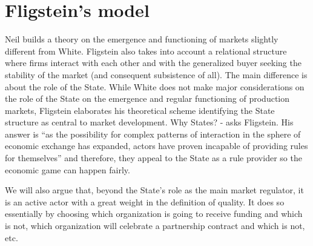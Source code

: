 \documentclass[a4paper, 12pt, openright, oneside, german, french, brazil, english]{abntex2}
\begin{document}
	
	\section{Fligstein's model}
	
	
	
	Neil  builds a theory on the emergence and functioning of markets slightly different from White. Fligstein also takes into account a relational structure where firms interact with each other and with the generalized buyer seeking the stability of the market (and consequent subsistence of all). The main difference is about the role of the State. While White does not make major considerations on the role of the State on the emergence and regular functioning of production markets, Fligstein elaborates his theoretical scheme identifying the State structure as central to market development. Why States? - asks Fligstein. His answer is ``as the possibility for complex patterns of interaction in the sphere of economic exchange has expanded, actors have proven incapable of providing rules for themselves'' \cite[p. 27-8]{fligstein2002architecture} and therefore, they appeal to the State as a rule provider so the economic game can happen fairly.

        We will also argue that, beyond the State's role as the main market regulator, it is an active actor with a great weight in the definition of quality. It does so essentially by choosing which organization is going to receive funding and which is not, which organization will celebrate a partnership contract and which is not, etc.
	
\end{document}
